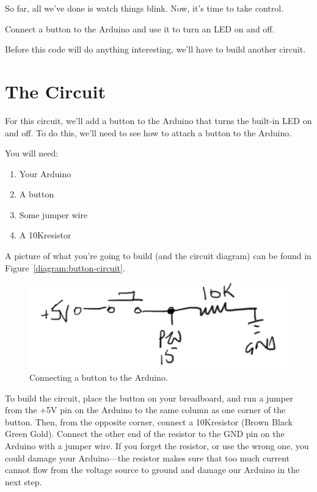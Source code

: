So far, all we've done is watch things blink. Now, it's time to take control.

\GOALS
Connect a button to the Arduino and use it to turn an LED on and off.

\CODE


Before this code will do anything interesting, we'll have to build another circuit.

\section{The Circuit}
For this circuit, we'll add a button to the Arduino that turns the built-in LED on and off. To do this, we'll need to see how to attach a button to the Arduino.

You will need:
\begin{enumerate}
	\item Your Arduino
	\item A button
	\item Some jumper wire
	\item A 10K\ohm resistor
\end{enumerate}

A picture of what you're going to build (and the circuit diagram) can be found in Figure~\vref{diagram:button-circuit}.

\begin{figure}[h]
  \begin{center}
    \includegraphics[width=0.6\linewidth]{images/button-circuit}
    \caption{Connecting a button to the Arduino.}
    \label{diagram:button-circuit}
  \end{center}
\end{figure}

To build the circuit, place the button on your breadboard, and run a jumper from the {\code +5V} pin on the Arduino to the same column as one corner of the button. Then, from the opposite corner, connect a 10K\ohm resistor (Brown Black Green Gold). Connect the other end of the resistor to the {\code GND} pin on the Arduino with a jumper wire. If you forget the resistor, or use the wrong one, you could damage your Arduino---the resistor makes sure that too much current cannot flow from the voltage source to ground and damage our Arduino in the next step.

